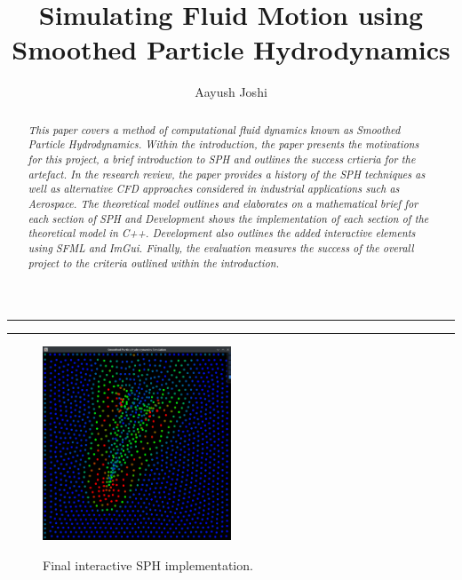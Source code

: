 \documentclass[a4paper,11pt]{article}
\title{\textbf{Simulating Fluid Motion using Smoothed Particle Hydrodynamics}}
\author{Aayush Joshi}
\date{}
\begin{document}
\maketitle

\par\noindent\rule{\textwidth}{0.3pt}

\begin{abstract}
\noindent \textit{This paper covers a method of computational fluid dynamics known as Smoothed Particle Hydrodynamics. Within the introduction, the paper presents the motivations for this project, a brief introduction to SPH and outlines the success crtieria for the artefact. In the research review, the paper provides a history of the SPH techniques as well as alternative CFD approaches considered in industrial applications such as Aerospace. The theoretical model outlines and elaborates on a mathematical brief for each section of SPH and Development shows the implementation of each section of the theoretical model in C++. Development also outlines the added interactive elements using SFML and ImGui. Finally, the evaluation measures the success of the overall project to the criteria outlined within the introduction.}

\end{abstract}

\par\noindent\rule{\textwidth}{0.3pt}
\begin{figure}[h]
\centering
 \includegraphics[width=0.5\textwidth]{mouse_drag.png} \par
 Final interactive SPH implementation.
\end{figure}
\end{document}
